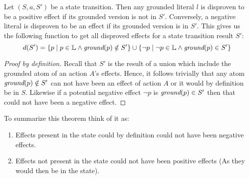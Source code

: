 \documentclass[../Master.tex]{subfiles}
\begin{document}
\begin{theorem}\label{thm:nca:disprove-effects}
	 Let $\left(S, a, S'\right)$ be a state transition. Then any grounded literal $l$ is disproven to be a positive effect if its grounded version is not in $S'$. Conversely, a negative literal is disproven to be an effect if its grounded version is in $S'$. This gives us the following function to get all disproved effects for a state transition result $S'$:	
	\begin{equation*}
		 d(S') = \left\{
			p \mid p \in \mathbb{L} \land \textit{ground} (p) \notin S'
			\right\} 
			\cup
			 \left\{
			\neg p \mid \neg p \in \mathbb{L} \land \textit{ground}(p) \in S'
			\right\}
	\end{equation*}
\end{theorem}
	\begin{proof}[Proof by definition]
		Recall that $S'$ is the result of a union which include the grounded atom of an action $A$'s effects. Hence, it follows trivially that any atom $\textit{ground}(p) \notin S'$ can not have been an effect of action $A$ or it would by definition be in $S$.
	Likewise if a potential negative effect $\neg p$ is $\textit{ground}(p) \in S'$ then that could not have been a negative effect.
	\end{proof}
	
	To summarize this theorem think of it as: 
	\begin{enumerate}
		\item Effects present in the state could by definition could not have been negative effects.
		\item  Effects not present in the state could not have been positive effects (As they would then be in the state).
	\end{enumerate}
	
	
	
\end{document}
